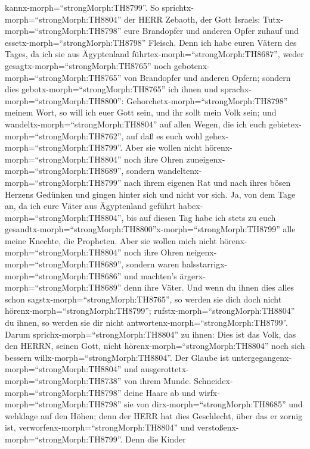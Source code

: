 kannx-morph=``strongMorph:TH8799''.  So
sprichtx-morph=``strongMorph:TH8804'' der HERR Zebaoth, der Gott
Israels: Tutx-morph=``strongMorph:TH8798'' eure Brandopfer und anderen
Opfer zuhauf und essetx-morph=``strongMorph:TH8798'' Fleisch.
 Denn ich habe euren Vätern des Tages, da ich sie aus
Ägyptenland führtex-morph=``strongMorph:TH8687'', weder
gesagtx-morph=``strongMorph:TH8765'' noch
gebotenx-morph=``strongMorph:TH8765'' von Brandopfer und anderen Opfern;
 sondern dies gebotx-morph=``strongMorph:TH8765'' ich ihnen
und sprachx-morph=``strongMorph:TH8800'':
Gehorchetx-morph=``strongMorph:TH8798'' meinem Wort, so will ich euer
Gott sein, und ihr sollt mein Volk sein; und
wandeltx-morph=``strongMorph:TH8804'' auf allen Wegen, die ich euch
gebietex-morph=``strongMorph:TH8762'', auf daß es euch wohl
gehex-morph=``strongMorph:TH8799''.  Aber sie wollen nicht
hörenx-morph=``strongMorph:TH8804'' noch ihre Ohren
zuneigenx-morph=``strongMorph:TH8689'', sondern
wandeltenx-morph=``strongMorph:TH8799'' nach ihrem eigenen Rat und nach
ihres bösen Herzens Gedünken und gingen hinter sich und nicht vor sich.
 Ja, von dem Tage an, da ich eure Väter aus Ägyptenland
geführt habex-morph=``strongMorph:TH8804'', bis auf diesen Tag habe ich
stets zu euch
gesandtx-morph=``strongMorph:TH8800''x-morph=``strongMorph:TH8799'' alle
meine Knechte, die Propheten.  Aber sie wollen mich nicht
hörenx-morph=``strongMorph:TH8804'' noch ihre Ohren
neigenx-morph=``strongMorph:TH8689'', sondern waren
halsstarrigx-morph=``strongMorph:TH8686'' und machten's
ärgerx-morph=``strongMorph:TH8689'' denn ihre Väter.  Und
wenn du ihnen dies alles schon sagstx-morph=``strongMorph:TH8765'', so
werden sie dich doch nicht hörenx-morph=``strongMorph:TH8799'';
rufstx-morph=``strongMorph:TH8804'' du ihnen, so werden sie dir nicht
antwortenx-morph=``strongMorph:TH8799''.  Darum
sprichx-morph=``strongMorph:TH8804'' zu ihnen: Dies ist das Volk, das
den HERRN, seinen Gott, nicht hörenx-morph=``strongMorph:TH8804'' noch
sich bessern willx-morph=``strongMorph:TH8804''. Der Glaube ist
untergegangenx-morph=``strongMorph:TH8804'' und
ausgerottetx-morph=``strongMorph:TH8738'' von ihrem Munde. 
Schneidex-morph=``strongMorph:TH8798'' deine Haare ab und
wirfx-morph=``strongMorph:TH8798'' sie von
dirx-morph=``strongMorph:TH8685'' und wehklage auf den Höhen; denn der
HERR hat dies Geschlecht, über das er zornig ist,
verworfenx-morph=``strongMorph:TH8804'' und
verstoßenx-morph=``strongMorph:TH8799''.  Denn die Kinder
